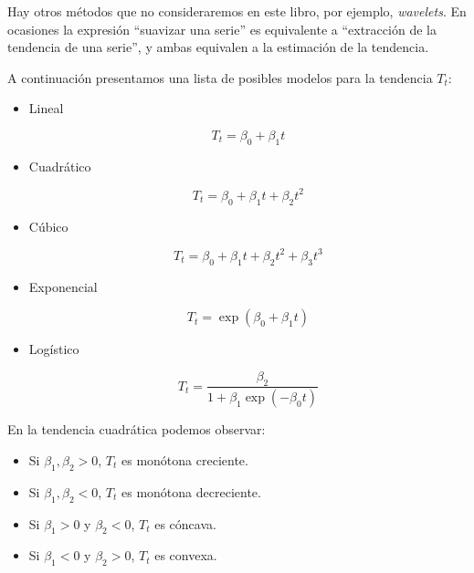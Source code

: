 \documentclass[12pt,]{krantz}
\providecommand{\tightlist}{%
  \setlength{\itemsep}{0pt}\setlength{\parskip}{0pt}}
\theoremstyle{definition}
\theoremstyle{definition}
\theoremstyle{definition}
\theoremstyle{remark}
\begin{document}
Hay otros métodos que no consideraremos en este libro, por ejemplo,
\emph{wavelets}. En ocasiones la expresión ``suavizar una serie'' es
equivalente a ``extracción de la tendencia de una serie'', y ambas
equivalen a la estimación de la tendencia.

A continuación presentamos una lista de posibles modelos para la
tendencia \(T_t\):

\begin{itemize}
\tightlist
\item
  Lineal

  \begin{equation}
  T_t=\beta_0+\beta_1t
  \label{eq:eq-modelo-lineal}
  \end{equation}
\item
  Cuadrático

  \begin{equation}
  T_t=\beta_0+\beta_1t+\beta_2t^2
  \label{eq:eq-modelo-cuadratico}
  \end{equation}
\item
  Cúbico

  \begin{equation}
  T_t=\beta_0+\beta_1t+\beta_2t^2+\beta_3t^3
  \label{eq:eq-modelo-cubico}
  \end{equation}
\item
  Exponencial

  \begin{equation}
  T_t=\exp(\beta_0+\beta_1t)
  \label{eq:eq-modelo-exponencial}
  \end{equation}
\item
  Logístico

  \begin{equation}
  T_t=\frac{\beta_2}{1+\beta_1\exp(-\beta_0t)}
  \label{eq:eq-modelo-logistico}
  \end{equation}
\end{itemize}

En la tendencia cuadrática podemos observar:

\begin{itemize}
\tightlist
\item
  Si \(\beta_1,\beta_2>0\), \(T_t\) es monótona creciente.
\item
  Si \(\beta_1,\beta_2<0\), \(T_t\) es monótona decreciente.
\item
  Si \(\beta_1>0\) y \(\beta_2<0\), \(T_t\) es cóncava.
\item
  Si \(\beta_1<0\) y \(\beta_2>0\), \(T_t\) es convexa.
\end{itemize}
\end{document}

